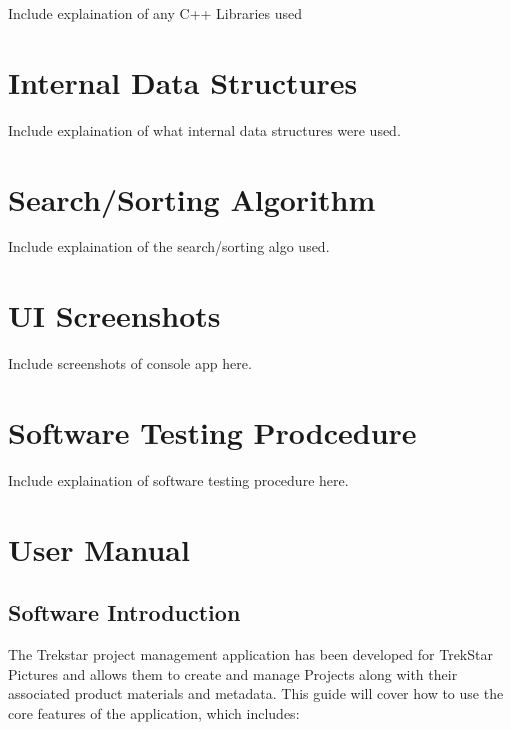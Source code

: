 \documentclass[
  english,
  a4paper,
,tablecaptionabove
]{scrartcl}
\begin{document}
Include explaination of any C++ Libraries used

\newpage

\hypertarget{internal-data-structures}{%
\section{Internal Data Structures}\label{internal-data-structures}}

Include explaination of what internal data structures were used.

\newpage

\hypertarget{searchsorting-algorithm}{%
\section{Search/Sorting Algorithm}\label{searchsorting-algorithm}}

Include explaination of the search/sorting algo used.

\newpage

\hypertarget{ui-screenshots}{%
\section{UI Screenshots}\label{ui-screenshots}}

Include screenshots of console app here.

\newpage

\hypertarget{software-testing-prodcedure}{%
\section{Software Testing
Prodcedure}\label{software-testing-prodcedure}}

Include explaination of software testing procedure here.

\newpage

\hypertarget{user-manual}{%
\section{User Manual}\label{user-manual}}

\hypertarget{software-introduction}{%
\subsection{Software Introduction}\label{software-introduction}}

The Trekstar project management application has been developed for
TrekStar Pictures and allows them to create and manage Projects along
with their associated product materials and metadata. This guide will
cover how to use the core features of the application, which includes:
\end{document}
